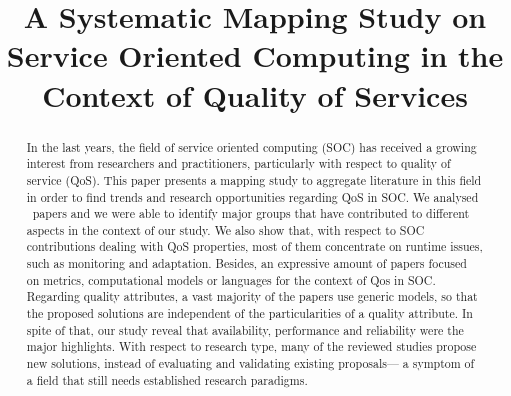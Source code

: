 \documentclass[conference]{IEEEtran}
\begin{document}
%
\title{A Systematic Mapping Study on Service Oriented Computing in the Context of Quality of Services}

\author{
}


\maketitle


\begin{abstract}
In the last years, the field of service oriented computing (SOC) has received a growing interest from researchers and practitioners, particularly with respect to quality of service (QoS). This paper presents a mapping study to aggregate literature in this field in order to find trends and research opportunities regarding QoS in SOC. We analysed \AcceptedPubs~papers and we were able to identify major groups that have contributed to different aspects in the context of our study. We also show that, with respect to SOC contributions dealing with QoS properties, most of them concentrate on runtime issues, such as monitoring and adaptation. Besides, an expressive amount of papers focused on metrics, computational models or languages for the context of Qos in SOC. Regarding quality attributes, a vast majority of the papers use generic models, so that the proposed solutions are independent of the particularities of a quality attribute. In spite of that, our study reveal that availability, performance and reliability 
were the major highlights. With respect to research type, many of the reviewed studies propose new solutions, instead of evaluating and validating existing proposals--- a symptom of a field that still needs established research paradigms.			
\end{abstract}
\end{document}
